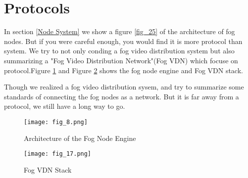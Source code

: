 \section{Protocols}
In section \ref{Node System} we show a figure \ref{fig_25} of the architecture of fog nodes.
But if you were careful enough, you would find it is more protocol than system. We try to not only
conding a fog video distribution system but also summarizing a "Fog Video Distribution Network"(Fog VDN)
which focuse on protocol.Figure \ref{fig_8} and Figure \ref{fig_17} shows the fog node engine and Fog VDN stack.

Though we realized a fog video distribution sysem, and try to summarize some standards of connecting
the fog nodes as a network. But it is far away from a protocol, we still have a long way to go.


\begin{figure}[htbp]
\centering
	  \texttt{[image: fig\_8.png]}
    \caption{Architecture of the Fog Node Engine}
 \label{fig_8}
\end{figure}

\begin{figure}[htbp]
\centering
	  \texttt{[image: fig\_17.png]}
    \caption{Fog VDN Stack}
 \label{fig_17}
\end{figure}
